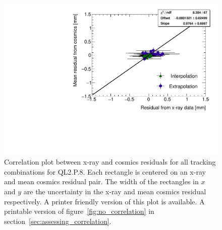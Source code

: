 \begin{figure}
    \centering
    \includegraphics[width = \textwidth]{figures/figure_QL2P08_3100V_2021-08-16_QL2P08_local_cosmic_and_xray_data_correlation_plot_printable.pdf}
    \caption{Correlation plot between x-ray and cosmics residuals for all tracking combinations for QL2.P.8. Each rectangle is centered on an x-ray and mean cosmics residual pair. The width of the rectangles in $x$ and $y$ are the uncertainty in the x-ray and mean cosmics residual respectively. A printer friendly version of this plot is available. A printable version of figure~\ref{fig:no_correlation} in section~\ref{sec:assessing_correlation}.}
    \label{fig:no_correlation_print}
\end{figure}